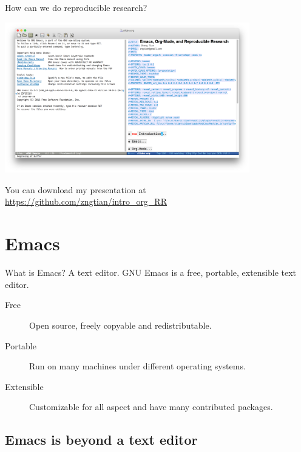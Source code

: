 \documentclass[presentation]{beamer}
\begin{document}
\begin{frame}[label={sec:orgfc11f18}]{How can we do reproducible research?}
\begin{center}
\includegraphics[width=0.8\textwidth]{figure/emacs_startup.png}
\end{center}

You can download my presentation at
\url{https://github.com/zngtian/intro\_org\_RR}
\end{frame}

\section{Emacs}
\label{sec:org3230949}

\begin{frame}[label={sec:org7220ed3}]{What is Emacs? A text editor.}
GNU Emacs is a free, portable, extensible text editor.

\begin{description}
\item[{Free}] Open source, freely copyable and redistributable.
\item[{Portable}] Run on many machines under different operating systems.
\item[{Extensible}] Customizable for all aspect and have many contributed
packages.
\end{description}
\end{frame}


\subsection{Emacs is beyond a text editor}
\label{sec:org9ab662a}
\end{document}
